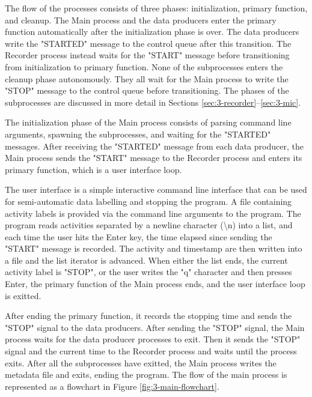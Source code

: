 The flow of the processes consists of three phases: initialization, primary function, and cleanup.
The Main process and the data producers enter the primary function automatically after the initialization phase is over.
The data producers write the "STARTED" message to the control queue after this transition.
The Recorder process instead waits for the "START" message before transitioning from initialization to primary function.
None of the subprocesses enters the cleanup phase autonomously.
They all wait for the Main process to write the "STOP" message to the control queue before transitioning.
The phases of the subprocesses are discussed in more detail in Sections \ref{sec:3-recorder}--\ref{sec:3-mic}.

The initialization phase of the Main process consists of parsing command line arguments,
spawning the subprocesses, and waiting for the "STARTED" messages.
After receiving the "STARTED" message from each data producer,
the Main process sends the "START" message to the Recorder process and enters its primary function, which is a user interface loop.

The user interface is a simple interactive command line interface that can be used for semi-automatic data labelling and stopping the program.
A file containing activity labels is provided via the command line arguments to the program.
The program reads activities separated by a newline character ({\textbackslash}n) into a list,
and each time the user hits the Enter key,
the time elapsed since sending the "START" message is recorded.
The activity and timestamp are then written into a file and the list iterator is advanced.
When either the list ends, the current activity label is "STOP", or the user writes the "q" character and then presses Enter,
the primary function of the Main process ends, and the user interface loop is exitted.

After ending the primary function,
it records the stopping time and sends the "STOP" signal to the data producers.
After sending the "STOP" signal, the Main process waits for the data producer processes to exit.
Then it sends the "STOP" signal and the current time to the Recorder process and waits until the process exits.
After all the subprocesses have exitted, the Main process writes the metadata file and exits,
ending the program.
The flow of the main process is represented as a flowchart in Figure \ref{fig:3-main-flowchart}.


